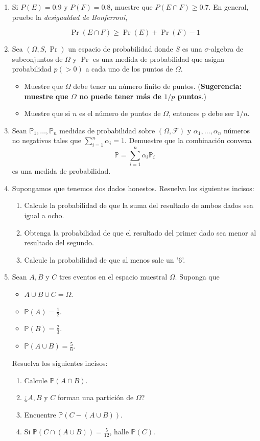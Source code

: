 \begin{enumerate}
\item Si $P(E) = 0.9$ y $P(F) = 0.8$, muestre que $P(E \cap F ) \ge 0.7.$ En general, pruebe la \textit{desigualdad de Bonferroni}, 

$$\Pr(E \cap F) \ge\Pr(E) +\Pr(F) - 1$$

\item  Sea $(\Omega, S,\Pr)$ un espacio de probabilidad donde $S$ es una $\sigma$-algebra de subconjuntos de $\Omega$ y $\Pr$ es una medida de probabilidad que asigna probabilidad $p(> 0)$ a cada uno de los puntos de $\Omega$.

\begin{itemize}
	\item Muestre que $\Omega$ debe tener un número finito de puntos. (\textbf{Sugerencia: muestre que $\Omega$ no puede tener más de $1/p$ puntos}.)
	\item Muestre que si $n$ es el número de puntos de $\Omega$, entonces p debe ser $1/n$.
\end{itemize}

		\item Sean $\mathbb{P}_1, \dots, \mathbb{P}_n$ medidas de probabilidad sobre $(\Omega, \mathcal{F})$ y $\alpha_1,\dots,\alpha_n$ números no negativos tales que $\sum_{i=1}^{n} \alpha_i = 1$. Demuestre que la combinación convexa
\[
\mathbb{P} = \sum_{i=1}^{n} \alpha_i \mathbb{P}_i
\]
es una medida de probabilidad.

\item Supongamos que tenemos dos dados honestos. Resuelva los siguientes incisos:
\begin{enumerate}
	\item Calcule la probabilidad de que la suma del resultado de ambos dados sea igual a ocho.
	\item Obtenga la probabilidad de que el resultado del primer dado sea menor al resultado del segundo.
	\item Calcule la probabilidad de que al menos sale un '6'.
\end{enumerate} 

\item Sean $A,B$ y $C$ tres eventos en el espacio muestral $\Omega$. Suponga que
\begin{itemize}
	\item $A \cup B \cup C = \Omega$.
	\item $\mathbb{P}(A) = \frac{1}{2}$.
	\item $\mathbb{P}(B) = \frac{2}{3}$.
	\item $\mathbb{P}(A \cup B) = \frac{5}{6}$.
\end{itemize}
Resuelva los siguientes incisos:
\begin{enumerate}
	\item Calcule $\mathbb{P}(A \cap B)$.
	\item ¿$A,B$ y $C$ forman una partición de $\Omega$?
	\item Encuentre $\mathbb{P}(C - (A \cup B))$.
	\item Si $\mathbb{P}(C \cap (A \cup B)) = \frac{5}{12}$, halle $\mathbb{P}(C)$.
\end{enumerate}


\end{enumerate}

